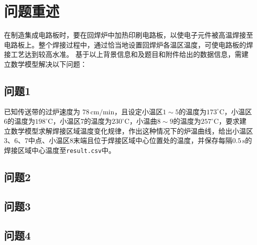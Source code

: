 \section{问题重述}
在制造集成电路板时，要在回焊炉中加热印刷电路板，以使电子元件被高温焊接至电路板上。整个焊接过程中，通过恰当地设置回焊炉各温区温度，可使电路板的焊接工艺达到较高水准。
基于以上背景信息和及题目和附件给出的数据信息，需建立数学模型解决以下问题：
\subsection{问题1}
已知传送带的过炉速度为 \(78\,\mathrm{cm}/\mathrm{min}\)，且设定小温区\(1{\sim} 5\)的温度为\(173 ^{\circ} \mathrm{C}\)，小温区6的温度为\(198^{\circ}\mathrm{C}\)，小温区7的温度为\(230^{\circ}\mathrm{C}\)，小温曲\(8{ \sim }9\)的温度为\(257^{\circ}\mathrm{C}\)，要求建立数学模型求解焊接区域温度变化规律，作出这种情况下的炉温曲线，给出小温区3、6、7中点、小温区8末端且位于焊接区域中心位置处的温度，并保存每隔\(0.5\, \mathrm{s}\)的焊接区域中心温度至\texttt{result.csv}中。
\subsection{问题2}
\subsection{问题3}
\subsection{问题4}
